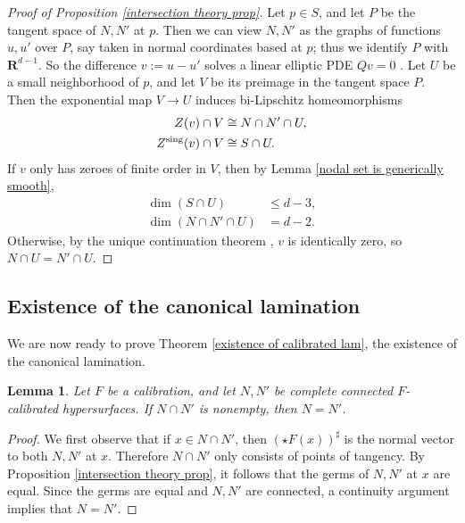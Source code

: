 \documentclass[reqno,11pt]{amsart}
\newcommand{\RR}{\mathbf{R}}
\newtheorem{lemma}[theorem]{Lemma}
\theoremstyle{definition}
\numberwithin{equation}{section}
\begin{document}
\begin{proof}[Proof of Proposition \ref{intersection theory prop}]
Let $p \in S$, and let $P$ be the tangent space of $N, N'$ at $p$.
Then we can view $N, N'$ as the graphs of functions $u, u'$ over $P$, say taken in normal coordinates based at $p$; thus we identify $P$ with $\RR^{d - 1}$.
So the difference $v := u - u'$ solves a linear elliptic PDE $Qv = 0$ \cite[Proof of Theorem 7.3]{colding2011course}.
Let $U$ be a small neighborhood of $p$, and let $V$ be its preimage in the tangent space $P$.
Then the exponential map $V \to U$ induces bi-Lipschitz homeomorphisms
\begin{align*}
Z(v) \cap V &\cong N \cap N' \cap U, \\
Z^{\rm sing}(v) \cap V &\cong S \cap U.
\end{align*}
If $v$ only has zeroes of finite order in $V$, then by Lemma \ref{nodal set is generically smooth},
\begin{align*}
\dim (S \cap U) &\leq d - 3, \\
\dim (N \cap N' \cap U) &= d - 2.
\end{align*}
Otherwise, by the unique continuation theorem \cite[Theorem 6.1]{colding2011course}, $v$ is identically zero, so $N \cap U = N' \cap U$.
\end{proof}

\subsection{Existence of the canonical lamination}
We are now ready to prove Theorem \ref{existence of calibrated lam}, the existence of the canonical lamination.

\begin{lemma}\label{calibrated implies disjoint}
Let $F$ be a calibration, and let $N, N'$ be complete connected $F$-calibrated hypersurfaces.
If $N \cap N'$ is nonempty, then $N = N'$.
\end{lemma}
\begin{proof}
We first observe that if $x \in N \cap N'$, then $(\star F(x))^\sharp$ is the normal vector to both $N, N'$ at $x$.
Therefore $N \cap N'$ only consists of points of tangency.
By Proposition \ref{intersection theory prop}, it follows that the germs of $N, N'$ at $x$ are equal.
Since the germs are equal and $N, N'$ are connected, a continuity argument implies that $N = N'$.
\end{proof}
\end{document}
